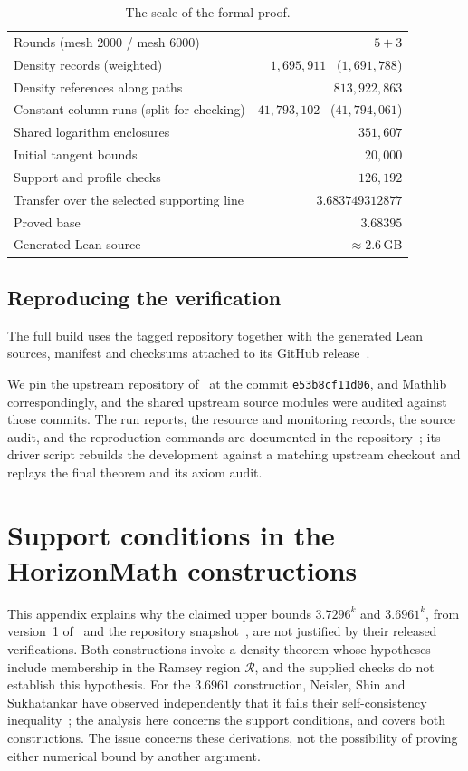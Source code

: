 \documentclass[11pt]{article}
\theoremstyle{definition}
\theoremstyle{remark}
\newcommand{\RR}{\mathcal R}
\numberwithin{equation}{section}
\begin{document}
\begin{table}[t]
\centering
\caption{The scale of the formal proof.}
\label{tab:lean}
\begin{tabular}{lr}
\toprule
Rounds (mesh $2000$ / mesh $6000$) & $5+3$\\
Density records (weighted) & $1{,}695{,}911$ \ ($1{,}691{,}788$)\\
Density references along paths & $813{,}922{,}863$\\
Constant-column runs (split for checking) & $41{,}793{,}102$ \ ($41{,}794{,}061$)\\
Shared logarithm enclosures & $351{,}607$\\
Initial tangent bounds & $20{,}000$\\
Support and profile checks & $126{,}192$\\
Transfer over the selected supporting line & $3.683749312877$\\
Proved base & $3.68395$\\
Generated Lean source & $\approx2.6$\,GB\\
\bottomrule
\end{tabular}
\end{table}

\subsection{Reproducing the verification}

The full build uses the tagged repository together with the generated
Lean sources, manifest and checksums attached to its GitHub
release~\cite{Artifact}.

We pin the upstream repository of~\cite{NSS} at the commit
\texttt{e53b8cf11d06}, and Mathlib correspondingly, and the shared
upstream source modules were audited against those commits. The run
reports, the resource and monitoring records, the source audit, and
the reproduction commands are documented in the
repository~\cite{Artifact}; its driver script rebuilds the
development against a matching upstream checkout and replays the
final theorem and its axiom audit.

\section{Support conditions in the HorizonMath constructions}\label{app:horizon}

This appendix explains why the claimed upper bounds $3.7296^k$ and
$3.6961^k$, from version~1 of~\cite{Horizon} and the repository
snapshot~\cite{HorizonCode}, are not justified by their released
verifications. Both constructions invoke a density theorem whose
hypotheses include membership in the Ramsey region $\RR$, and the
supplied checks do not establish this hypothesis. For the $3.6961$
construction, Neisler, Shin and Sukhatankar have observed
independently that it fails their self-consistency
inequality~\cite{NSS}; the analysis here concerns the support
conditions, and covers both constructions. The issue concerns
these derivations, not the possibility of proving either numerical
bound by another argument.
\end{document}
